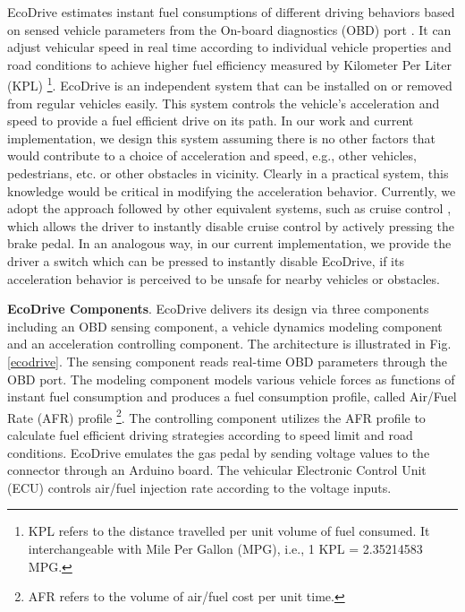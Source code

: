 EcoDrive estimates instant fuel consumptions of different driving behaviors
based on sensed vehicle parameters from the On-board diagnostics (OBD) port \cite{obd, pid}. 
It can adjust vehicular speed in real time according to 
individual vehicle properties and road conditions 
to achieve higher fuel efficiency measured by Kilometer Per Liter (KPL)
\footnote{KPL refers to the distance travelled per unit volume of fuel consumed. 
It interchangeable with Mile Per Gallon (MPG), i.e., 1 KPL = 2.35214583 MPG.}.
EcoDrive is an independent system that can be installed on or removed from 
regular vehicles easily. 
This system controls the vehicle's acceleration and speed 
to provide a fuel efficient drive on its path. 
In our work and current implementation, 
we design this system assuming there is no other factors that 
would contribute to a choice of acceleration and speed, 
e.g., other vehicles, pedestrians, etc. or other obstacles in vicinity. 
Clearly in a practical system, this knowledge would be critical in modifying the acceleration behavior. 
Currently, we adopt the approach followed by other equivalent systems, 
such as cruise control \cite{cruise_control}, which allows the driver to instantly 
disable cruise control by actively pressing the brake pedal. 
In an analogous way, in our current implementation, 
we provide the driver a switch which can be pressed to instantly disable EcoDrive, 
if its acceleration behavior is perceived to be unsafe for nearby vehicles or obstacles.






\textbf{EcoDrive Components}. 
EcoDrive delivers its design via three components including an OBD sensing component, 
a vehicle dynamics modeling component and an acceleration controlling component. 
The architecture is illustrated in Fig. \ref{ecodrive}. 
The sensing component reads real-time OBD parameters through
the OBD port. 
The modeling component models various vehicle forces 
as functions of instant fuel consumption and produces
a fuel consumption profile, called Air/Fuel Rate (AFR) profile
\footnote{AFR refers to the volume of air/fuel cost per unit time.}.
The controlling component utilizes the AFR profile to calculate fuel efficient
driving strategies according to speed limit and road conditions. 
EcoDrive emulates the gas pedal by sending voltage values to 
the connector through an Arduino board.
The vehicular Electronic Control Unit (ECU) controls air/fuel injection rate
according to the voltage inputs. 

